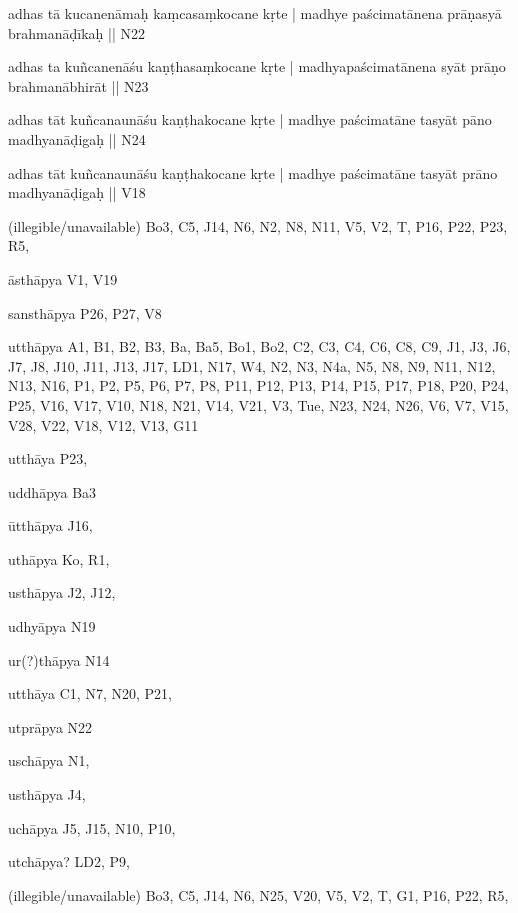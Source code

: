 \begin{ekdosis}
\begin{marma}[hp01_055]
\begin{marma}[hp02_009]
\begin{marma}[hp02_011]
\begin{marma}[hp02_46]
\item[adhas tā kucanenāmaḥ kaṃcasaṃkocane kṛte | madhye paścimatānena prāṇasyā brahmanāḍīkaḥ ||] N22
\item[adhas ta kuñcanenāśu kaṇṭhasaṃkocane kṛte | madhyapaścimatānena syāt prāṇo brahmanābhirāt ||] N23
\item[adhas tāt kuñcanaunāśu kaṇṭhakocane kṛte | madhye paścimatāne tasyāt pāno madhyanāḍigaḥ ||] N24
\item[adhas tāt kuñcanaunāśu kaṇṭhakocane kṛte | madhye paścimatāne tasyāt prāno madhyanāḍigaḥ ||] V18
\item[(illegible/unavailable)] Bo3, C5, J14, N6, N2, N8, N11, V5, V2, T, P16, P22, P23, R5,
  \begin{description}

    \end{description}
 \end{marma}

 \begin{marma}[hp02_48b]
\item[āsthāpya] V1, V19
\item[sansthāpya] P26, P27, V8
\item[utthāpya] A1, B1, B2, B3, Ba, Ba5, Bo1, Bo2, C2, C3, C4, C6, C8, C9, J1, J3, J6, J7, J8, J10, J11, J13, J17, LD1, N17, W4, N2, N3, N4a, N5, N8, N9, N11, N12, N13, N16, P1, P2, P5, P6, P7, P8, P11, P12, P13, P14, P15, P17, P18, P20, P24, P25, V16, V17, V10, N18, N21, V14, V21, V3, Tue, N23, N24, N26, V6, V7, V15, V28, V22, V18, V12, V13, G11
\item[utthāya] P23,
\item[uddhāpya] Ba3
\item[ūtthāpya] J16,
\item[uthāpya] Ko, R1, 
\item[usthāpya] J2, J12, 
\item[udhyāpya] N19
\item[ur(?)thāpya] N14
\item[utthāya] C1, N7, N20, P21, 
\item[utprāpya] N22
\item[uschāpya] N1, 
\item[usthāpya] J4,
\item[uchāpya] J5, J15, N10, P10, 
\item[utchāpya?] LD2, P9, 
\item[(illegible/unavailable)] Bo3, C5, J14, N6, N25, V20, V5, V2, T, G1, P16, P22, R5,

  \begin{description}


\end{description}
\end{marma}
\end{marma}
\end{marma}
\end{marma}
\end{ekdosis}
